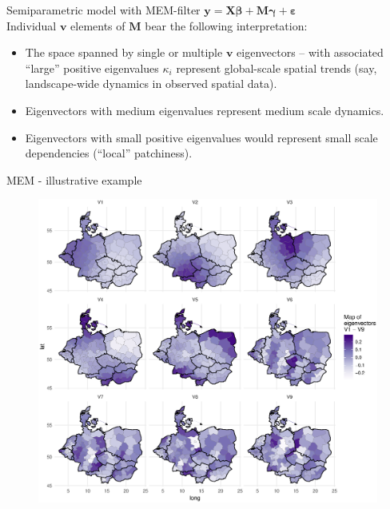 \documentclass{beamer}
\begin{document}
\begin{frame}{Semiparametric model with MEM-filter}
$\bm{y} = \bm{X \beta } + \bm{M \gamma} + \bm{\varepsilon}$\\
\medskip
Individual $\bm{v}$ elements of $\bm{M}$ bear the following interpretation:\\
\bigskip
\begin{itemize}
    \item  The space spanned by single or multiple $\bm{v}$ eigenvectors -- with associated ``large'' positive eigenvalues $\kappa_i$ represent global-scale spatial trends (say, landscape-wide dynamics in observed spatial data). 
    \medskip
    \item Eigenvectors with medium eigenvalues represent medium scale dynamics. 
    \medskip
    \item Eigenvectors with small positive eigenvalues would represent small scale dependencies (``local'' patchiness).   
\end{itemize}
\end{frame}
\begin{frame}{MEM - illustrative example}
\vspace{-0.3cm}
\begin{figure}
	\includegraphics[width=.8\textwidth]{IMG/sp_Eigen.eps}
\end{figure}
\end{frame}
\end{document}
